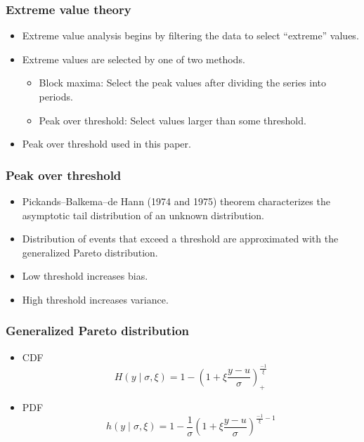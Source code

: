 \documentclass{beamer}
\begin{document}
\begin{frame}
  \frametitle{Extreme value theory}
  \begin{itemize}
  \item Extreme value analysis begins by filtering the data to select
    ``extreme'' values.
    \item Extreme values are selected by one of two methods.
  \begin{itemize}
  \item Block maxima: Select the peak values after dividing the series into periods.
  \item Peak over threshold: Select values larger than some threshold.
  \end{itemize}
    \item Peak over threshold used in this paper.
  \end{itemize}
\end{frame}

\begin{frame}
  \frametitle{Peak over threshold}
  \begin{itemize}
    \item Pickands--Balkema--de Hann (1974 and 1975) theorem characterizes the asymptotic
      tail distribution of an unknown distribution.
      \item Distribution of events that exceed a threshold are approximated with
        the generalized Pareto distribution.
      \item Low threshold increases bias.
      \item High threshold increases variance.
  \end{itemize}
\end{frame}

\begin{frame}
  \frametitle{Generalized Pareto distribution}
  \begin{itemize}
  \item CDF
    \begin{equation*}
      H(y\mid\sigma,\xi)
      =
      1-\left(1+\xi\frac{y-u}{\sigma}\right)_+^{\frac{-1}{\xi}}
    \end{equation*}
  \item PDF
    \begin{equation*}
      h(y\mid\sigma,\xi)
      =
      1-\frac{1}{\sigma}\left(1+\xi\frac{y-u}{\sigma}\right)^{\frac{-1}{\xi}-1}
    \end{equation*}
  \end{itemize}
\end{frame}
\end{document}
